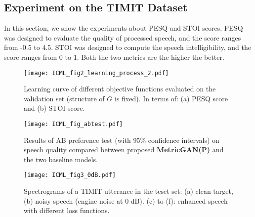 \documentclass{article}
\begin{document}
\subsection{Experiment on the TIMIT Dataset}
In this section, we show the experiments about PESQ and STOI scores.  PESQ was designed to evaluate the quality of processed speech, and the score ranges from -0.5 to 4.5. STOI was designed to compute the speech intelligibility, and the score ranges from 0 to 1. Both the two metrics are the higher the better. 

\begin{figure}[ht]
\vskip -0.1in
\begin{center}
\centerline{\texttt{[image: ICML\_fig2\_learning\_process\_2.pdf]}}
\vskip -0.2in
\caption{Learning curve of different objective functions evaluated on the validation set (structure of $G$ is fixed). In terms of: (a) PESQ score and (b) STOI score.}
\label{fig:learning_process}
\end{center}
\vskip -0.2in
\end{figure}

\begin{figure}[ht]
\vskip 0.05in
\begin{center}
\centerline{\texttt{[image: ICML\_fig\_abtest.pdf]}}
\vskip 0.0in
\caption{Results of AB preference test (with 95\% confidence intervals) on speech quality compared between proposed \textbf{MetricGAN(P)} and the two baseline models.}
\label{fig:abtest}
\end{center}
\vskip -0.2in
\end{figure}

\begin{figure*}[ht]
\begin{center}
\centerline{\texttt{[image: ICML\_fig3\_0dB.pdf]}}
\vskip -0.3in
\caption{Spectrograms of a TIMIT utterance in the teset set: (a) clean target, (b) noisy speech (engine noise at 0 dB). (c) to (f): enhanced speech with different loss functions. }
\label{fig:demo_different_loss}
\end{center}
\vskip -0.2in
\end{figure*}
\end{document}
